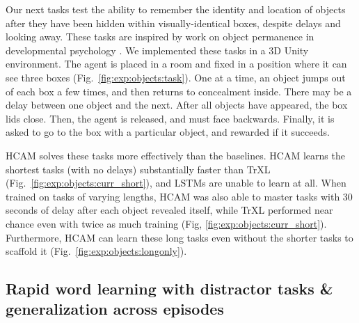\documentclass{article}
\begin{document}
Our next tasks test the ability to remember the identity and location of objects after they have been hidden within visually-identical boxes, despite delays and looking away. These tasks are inspired by work on object permanence in developmental psychology \citep[e.g.][]{baillargeon2004infants}. We implemented these tasks in a 3D Unity environment. The agent is placed in a room and fixed in a position where it can see three boxes (Fig.\ \ref{fig:exp:objects:task}). One at a time, an object jumps out of each box a few times, and then returns to concealment inside. There may be a delay between one object and the next. After all objects have appeared, the box lids close. Then, the agent is released, and must face backwards. Finally, it is asked to go to the box with a particular object, and rewarded if it succeeds.

HCAM solves these tasks more effectively than the baselines. HCAM learns the shortest tasks (with no delays) substantially faster than TrXL (Fig.\ \ref{fig:exp:objects:curr_short}), and LSTMs are unable to learn at all. When trained on tasks of varying lengths, HCAM was also able to master tasks with 30 seconds of delay after each object revealed itself, while TrXL performed near chance even with twice as much training (Fig, \ref{fig:exp:objects:curr_short}). Furthermore, HCAM can learn these long tasks even without the shorter tasks to scaffold it (Fig.\ \ref{fig:exp:objects:longonly}).

\subsection{Rapid word learning with distractor tasks \& generalization across episodes} \label{sec:exp:fastbind}
\end{document}

